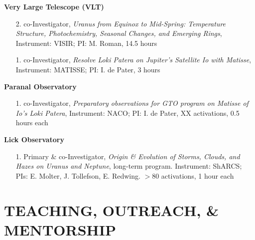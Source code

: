 \documentclass[margin, 10pt]{res} %
\begin{document}
\begin{resume}
\begin{enumerate}
\end{enumerate}
\vspace{-0.3cm}
\textbf{Very Large Telescope (VLT)} 
\begin{enumerate}
	\item[2.] co-Investigator, {\it Uranus from Equinox to Mid-Spring: Temperature Structure, Photochemistry, Seasonal Changes, and Emerging Rings}, Instrument: VISIR; PI: M. Roman, 14.5 hours %
	\item[1.] co-Investigator, {\it Resolve Loki Patera on Jupiter’s Satellite Io with Matisse}, Instrument: MATISSE; PI: I. de Pater, 3 hours %
\end{enumerate}
\vspace{-0.3cm}
\textbf{Paranal Observatory}
\begin{enumerate}
	\item[1.] co-Investigator, {\it Preparatory observations for GTO program on Matisse of Io's Loki Patera}, Instrument: NACO; PI: I. de Pater, XX activations, 0.5 hours each %
\end{enumerate}
\vspace{-0.3cm}
\textbf{Lick Observatory} 
\begin{enumerate}
	\item[1.] Primary \& co-Investigator, {\it Origin \& Evolution of Storms, Clouds, and Hazes on Uranus and Neptune}, long-term program. Instrument: ShARCS; PIs: E. Molter, J. Tollefson, E. Redwing. $>$80 activations, 1 hour each %
\end{enumerate}


\section{TEACHING, OUTREACH, \& MENTORSHIP}


\end{resume}
\end{document}
